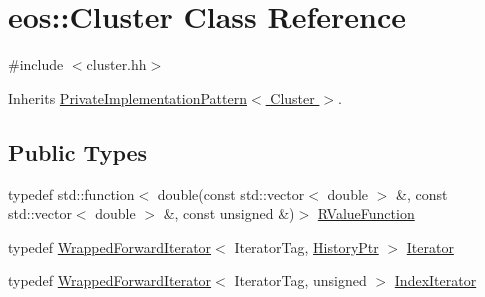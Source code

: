 \hypertarget{classeos_1_1Cluster}{
\section{eos::Cluster Class Reference}
\label{classeos_1_1Cluster}
}


{\ttfamily \#include $<$cluster.hh$>$}

Inherits \hyperlink{classeos_1_1PrivateImplementationPattern}{PrivateImplementationPattern$<$ Cluster $>$}.\subsection*{Public Types}
\begin{DoxyCompactItemize}
\item 
typedef std::function$<$ double(const std::vector$<$ double $>$ \&, const std::vector$<$ double $>$ \&, const unsigned \&)$>$ \hyperlink{classeos_1_1Cluster_a0c315d367de4288803597a0f23ee4168}{RValueFunction}
\item 
typedef \hyperlink{classeos_1_1WrappedForwardIterator}{WrappedForwardIterator}$<$ IteratorTag, \hyperlink{namespaceeos_ac9f30fde04446cfabdd69d4b5b5d3c5a}{HistoryPtr} $>$ \hyperlink{classeos_1_1Cluster_ab60d3bac87825b6181c4c6bb1f04d55a}{Iterator}
\item 
typedef \hyperlink{classeos_1_1WrappedForwardIterator}{WrappedForwardIterator}$<$ IteratorTag, unsigned $>$ \hyperlink{classeos_1_1Cluster_a39df87b5549e245b185b26f94c9d336b}{IndexIterator}
\end{DoxyCompactItemize}
